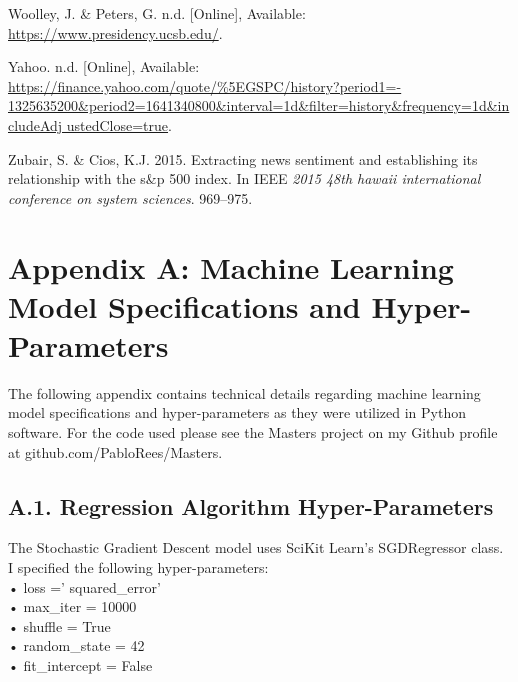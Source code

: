 \documentclass[11pt,preprint, authoryear]{elsarticle}
\numberwithin{equation}{section}
\numberwithin{figure}{section}
\numberwithin{table}{section}
\newlength{\cslhangindent}
\newenvironment{CSLReferences}%
  {\setlength{\parindent}{0pt}%
  \everypar{\setlength{\hangindent}{\cslhangindent}}\ignorespaces}%
  {\par}
\begin{document}
\begin{CSLReferences}
\leavevmode{}%
Woolley, J. \& Peters, G. n.d. {[}Online{]}, Available:
\url{https://www.presidency.ucsb.edu/}.

\leavevmode{}%
Yahoo. n.d. {[}Online{]}, Available:
\href{https://finance.yahoo.com/quote/\%5EGSPC/history?period1=-\%201325635200\&period2=1641340800\&interval=1d\&filter=history\&frequency=1d\&includeAdj\%20ustedClose=true}{https://finance.yahoo.com/quote/\%5EGSPC/history?period1=-
1325635200\&period2=1641340800\&interval=1d\&filter=history\&frequency=1d\&includeAdj
ustedClose=true}.

\leavevmode{}%
Zubair, S. \& Cios, K.J. 2015. Extracting news sentiment and
establishing its relationship with the s\&p 500 index. In IEEE
\emph{2015 48th hawaii international conference on system sciences}.
969--975.

\end{CSLReferences}

\newpage

\hypertarget{appendix-a-machine-learning-model-specifications-and-hyper-parameters}{%
\section*{Appendix A: Machine Learning Model Specifications and
Hyper-Parameters}\label{appendix-a-machine-learning-model-specifications-and-hyper-parameters}}

The following appendix contains technical details regarding machine
learning model specifications and hyper-parameters as they were utilized
in Python software. For the code used please see the Masters project on
my Github profile at github.com/PabloRees/Masters.

\hypertarget{a.1.-regression-algorithm-hyper-parameters}{%
\subsection*{A.1. Regression Algorithm
Hyper-Parameters}\label{a.1.-regression-algorithm-hyper-parameters}}

The Stochastic Gradient Descent model uses SciKit Learn's SGDRegressor
class. I specified the following hyper-parameters:\\
• loss =' squared\_error'\\
• max\_iter = 10000\\
• shuffle = True\\
• random\_state = 42\\
• fit\_intercept = False
\end{document}
